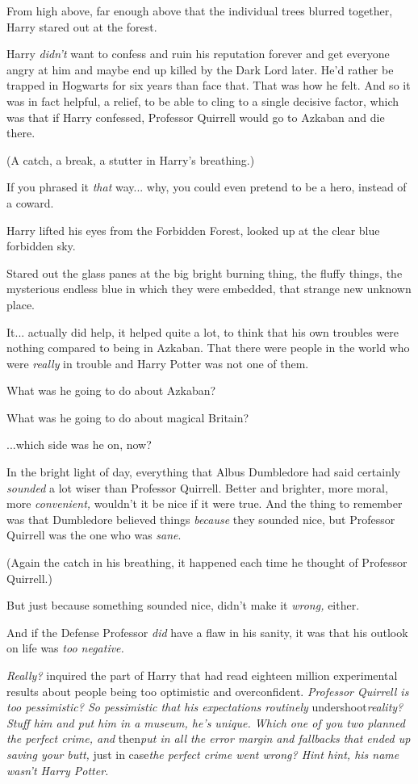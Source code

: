 From high above, far enough above that the individual trees blurred
together, Harry stared out at the forest.

Harry \emph{didn't} want to confess and ruin his reputation forever and
get everyone angry at him and maybe end up killed by the Dark Lord
later. He'd rather be trapped in Hogwarts for six years than face that.
That was how he felt. And so it was in fact helpful, a relief, to be
able to cling to a single decisive factor, which was that if Harry
confessed, Professor Quirrell would go to Azkaban and die there.

(A catch, a break, a stutter in Harry's breathing.)

If you phrased it \emph{that} way... why, you could even pretend to
be a hero, instead of a coward.

Harry lifted his eyes from the Forbidden Forest, looked up at the clear
blue forbidden sky.

Stared out the glass panes at the big bright burning thing, the fluffy
things, the mysterious endless blue in which they were embedded, that
strange new unknown place.

It... actually did help, it helped quite a lot, to think that his
own troubles were nothing compared to being in Azkaban. That there were
people in the world who were \emph{really} in trouble and Harry Potter
was not one of them.

What was he going to do about Azkaban?

What was he going to do about magical Britain?

...which side was he on, now?

In the bright light of day, everything that Albus Dumbledore had said
certainly \emph{sounded} a lot wiser than Professor Quirrell. Better and
brighter, more moral, more \emph{convenient,} wouldn't it be nice if it
were true. And the thing to remember was that Dumbledore believed things
\emph{because} they sounded nice, but Professor Quirrell was the one who
was \emph{sane}.

(Again the catch in his breathing, it happened each time he thought of
Professor Quirrell.)

But just because something sounded nice, didn't make it \emph{wrong,}
either.

And if the Defense Professor \emph{did} have a flaw in his sanity, it
was that his outlook on life was \emph{too negative.}

\emph{Really?} inquired the part of Harry that had read eighteen million
experimental results about people being too optimistic and
overconfident. \emph{Professor Quirrell is too pessimistic? So
pessimistic that his expectations routinely} undershoot\emph{reality?
Stuff him and put him in a museum, he's unique. Which one of you two
planned the perfect crime, and} then\emph{put in all the error margin
and fallbacks that ended up saving your butt,} just in case\emph{the
perfect crime went wrong? Hint hint, his name wasn't Harry Potter.}

